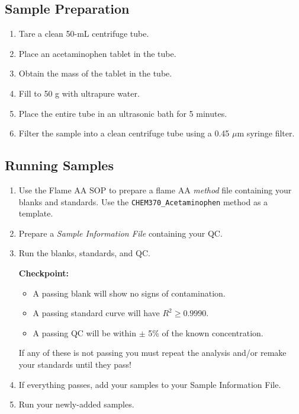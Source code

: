 \documentclass[]{tufte-book}
\providecommand{\tightlist}{%
  \setlength{\itemsep}{0pt}\setlength{\parskip}{0pt}}
\begin{document}
\hypertarget{sample-preparation-5}{%
\subsection{Sample Preparation}\label{sample-preparation-5}}

\begin{enumerate}
\def\labelenumi{\arabic{enumi}.}
\tightlist
\item
  Tare a clean 50-mL centrifuge tube.
\item
  Place an acetaminophen tablet in the tube.
\item
  Obtain the mass of the tablet in the tube.
\item
  Fill to 50 g with ultrapure water.
\item
  Place the entire tube in an ultrasonic bath for 5 minutes.
\item
  Filter the sample into a clean centrifuge tube using a 0.45 \(\mu\)m syringe filter.
\end{enumerate}

\hypertarget{running-samples-3}{%
\subsection{Running Samples}\label{running-samples-3}}

\begin{enumerate}
\def\labelenumi{\arabic{enumi}.}
\tightlist
\item
  Use the Flame AA SOP to prepare a flame AA \emph{method} file containing your blanks and standards. Use the \texttt{CHEM370\_Acetaminophen} method as a template.
\item
  Prepare a \emph{Sample Information File} containing your QC.
\item
  Run the blanks, standards, and QC.

  \begin{marginfigure}
   \textbf{Checkpoint:}

   \begin{itemize}
   \tightlist
   \item
     A passing blank will show no signs of contamination.\\
   \item
     A passing standard curve will have \(R^2 \ge 0.9990\).\\
   \item
     A passing QC will be within \(\pm\) 5\% of the known concentration.
   \end{itemize}

   If any of these is not passing you must repeat the analysis and/or
   remake your standards until they pass!
   \end{marginfigure}
\item
  If everything passes, add your samples to your Sample Information File.
\item
  Run your newly-added samples.
\end{enumerate}
\end{document}
